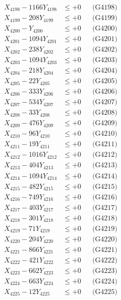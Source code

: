 \documentclass[a4paper,10pt]{article}
\begin{document}
{\begin{align}
X_{4198} - 1166Y_{4198} &\leq +0 && \text{(G4198)} \\
X_{4199} - 208Y_{4199} &\leq +0 && \text{(G4199)} \\
X_{4200} - Y_{4200} &\leq +0 && \text{(G4200)} \\
\allowbreak
X_{4201} - 1094Y_{4201} &\leq +0 && \text{(G4201)} \\
X_{4202} - 238Y_{4202} &\leq +0 && \text{(G4202)} \\
X_{4203} - 1094Y_{4203} &\leq +0 && \text{(G4203)} \\
X_{4204} - 218Y_{4204} &\leq +0 && \text{(G4204)} \\
X_{4205} - 22Y_{4205} &\leq +0 && \text{(G4205)} \\
X_{4206} - 333Y_{4206} &\leq +0 && \text{(G4206)} \\
X_{4207} - 534Y_{4207} &\leq +0 && \text{(G4207)} \\
X_{4208} - 33Y_{4208} &\leq +0 && \text{(G4208)} \\
X_{4209} - 476Y_{4209} &\leq +0 && \text{(G4209)} \\
X_{4210} - 96Y_{4210} &\leq +0 && \text{(G4210)} \\
\allowbreak
X_{4211} - 19Y_{4211} &\leq +0 && \text{(G4211)} \\
X_{4212} - 1016Y_{4212} &\leq +0 && \text{(G4212)} \\
X_{4213} - 404Y_{4213} &\leq +0 && \text{(G4213)} \\
X_{4214} - 1094Y_{4214} &\leq +0 && \text{(G4214)} \\
X_{4215} - 482Y_{4215} &\leq +0 && \text{(G4215)} \\
X_{4216} - 749Y_{4216} &\leq +0 && \text{(G4216)} \\
X_{4217} - 403Y_{4217} &\leq +0 && \text{(G4217)} \\
X_{4218} - 301Y_{4218} &\leq +0 && \text{(G4218)} \\
X_{4219} - 71Y_{4219} &\leq +0 && \text{(G4219)} \\
X_{4220} - 204Y_{4220} &\leq +0 && \text{(G4220)} \\
\allowbreak
X_{4221} - 866Y_{4221} &\leq +0 && \text{(G4221)} \\
X_{4222} - 421Y_{4222} &\leq +0 && \text{(G4222)} \\
X_{4223} - 662Y_{4223} &\leq +0 && \text{(G4223)} \\
X_{4224} - 663Y_{4224} &\leq +0 && \text{(G4224)} \\
X_{4225} - 12Y_{4225} &\leq +0 && \text{(G4225)} \\

\end{align}}
\end{document}

